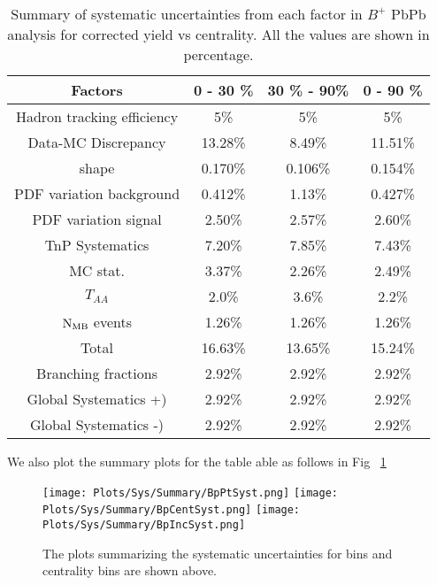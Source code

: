 \begin{table}[h]
\begin{center}
\caption{Summary of systematic uncertainties from each factor in $B^+$ PbPb analysis for corrected yield vs centrality. All the values are shown in percentage.}
\vspace{1em}
\label{tab:sys_sum_Bu_PbPbCent}
  \begin{tabular}{| c | c | c | c| }
    \hline
    Factors &   0 - 30 \% & 30 \% - 90\% & 0 - 90 \% \\
    \hline
    Hadron tracking efficiency  & 5\% & 5\% & 5\% \\
    Data-MC Discrepancy   &  13.28\% & 8.49\% & 11.51\%  \\
	\pt shape  & 0.170\%  &  0.106\%& 0.154\%\\
    PDF variation background & 0.412\% & 1.13\% & 0.427\%  \\
    PDF variation signal & 2.50\% & 2.57\% & 2.60\%  \\
TnP Systematics  & 7.20\% & 7.85\% & 7.43\% \\
	MC stat. & 3.37\% & 2.26\%  & 2.49\%  \\
    $T_{AA}$ & 2.0\% & 3.6\% & 2.2\%\\	
      $\rm{N_{MB}} $ events & 1.26\% & 1.26\% & 1.26\% \\
    Total  & 16.63\%  & 13.65\% & 15.24\% \\

    \hline
    \hline
    Branching fractions &  2.92\%  &  2.92\%   &  2.92\% \\
      Global Systematics +) & 2.92\% & 2.92\% &  2.92\%\\ 
      Global Systematics -) & 2.92\% & 2.92\% &  2.92\%\\  
    \hline
\end{tabular}
\end{center}
\end{table}







We also plot the summary plots for the table able as follows in Fig ~\ref{fig:SummaryTable}

\clearpage

\begin{figure}[h]
\begin{center}
\texttt{[image: Plots/Sys/Summary/BpPtSyst.png]}
\texttt{[image: Plots/Sys/Summary/BpCentSyst.png]}
\texttt{[image: Plots/Sys/Summary/BpIncSyst.png]}
\caption{The plots summarizing the systematic uncertainties for \pt bins and centrality bins are shown above.}
\label{fig:SummaryTable}
\end{center}
\end{figure}


